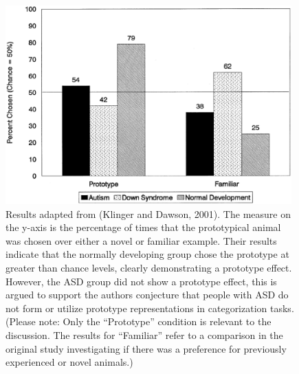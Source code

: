 \documentclass[man]{apa}
\begin{document}
\begin{figure}[ht]
\begin{center}
	\includegraphics[width=110mm]{figures/klinger_results.eps}
\end{center}
\caption{Results adapted from (Klinger and Dawson, 2001).  The measure on the y-axis is the percentage of times that the prototypical animal was chosen over either a novel or familiar example. Their results indicate that the normally developing group chose the prototype at greater than chance levels, clearly demonstrating a prototype effect.  However, the ASD group did not show a prototype effect, this is argued to support the authors conjecture that people with ASD do not form or utilize prototype representations in categorization tasks. (Please note: Only the ``Prototype'' condition is relevant to the discussion.  The results for ``Familiar'' refer to a comparison in the original study investigating if there was a preference for previously experienced or novel animals.)}
\label{klinger_results}
\end{figure} 
\end{document}
